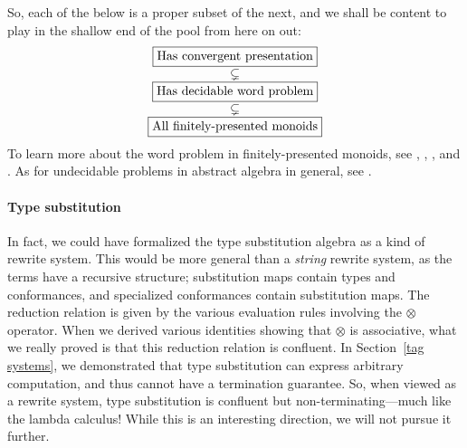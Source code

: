 \documentclass[../generics]{subfiles}
\begin{document}
So, each of the below is a proper subset of the next, and we shall be content to play in the shallow end of the pool from here on out:
\[
\begin{array}{c}
\boxed{\hbox{Has convergent presentation}} \\
\subsetneq \\
\boxed{\hbox{Has decidable word problem}} \\
\subsetneq \\
\boxed{\hbox{All finitely-presented monoids}}
\end{array}
\]
To learn more about the word problem in finitely-presented monoids, see \cite{fptype}, \cite{fdtfp3}, \cite{mild}, and \cite{Otto1997}. As for undecidable problems in abstract algebra in general, see \cite{tarski1953undecidable}.

\paragraph{Type substitution} In fact, we could have formalized the type substitution algebra as a kind of rewrite system. This would be more general than a \emph{string} rewrite system, as the terms have a recursive structure; substitution maps contain types and conformances, and specialized conformances contain substitution maps. The reduction relation is given by the various evaluation rules involving the $\otimes$ operator. When we derived various identities showing that $\otimes$ is associative, what we really proved is that this reduction relation is confluent. In Section~\ref{tag systems}, we demonstrated that type substitution can express arbitrary computation, and thus cannot have a termination guarantee. So, when viewed as a rewrite system, type substitution is confluent but non-terminating---much like the lambda calculus! While this is an interesting direction, we will not pursue it further.
\end{document}

